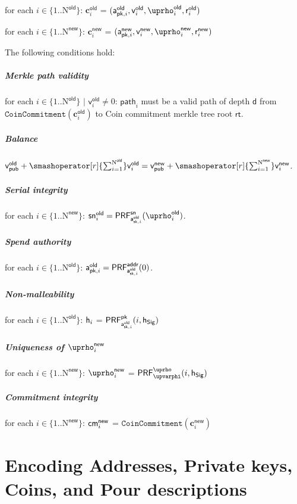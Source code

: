 \documentclass{article}
\newcommand{\SpendAuthorityPublicOld}[1]{\mathsf{a^{old}_{pk,\mathnormal{#1}}}}
\newcommand{\SpendAuthorityPrivateOld}[1]{\mathsf{a^{old}_{sk,\mathnormal{#1}}}}
\newcommand{\SpendAuthorityPublicNew}[1]{\mathsf{a^{new}_{pk,\mathnormal{#1}}}}
\newcommand{\CoinCommitRandOld}[1]{\mathsf{r^{old}_\mathnormal{#1}}}
\newcommand{\CoinCommitRandNew}[1]{\mathsf{r^{new}_\mathnormal{#1}}}
\newcommand{\CoinAddressRand}{\mathsf{\uprho}}
\newcommand{\CoinAddressRandOld}[1]{\mathsf{\uprho^{old}_\mathnormal{#1}}}
\newcommand{\CoinAddressRandNew}[1]{\mathsf{\uprho^{new}_\mathnormal{#1}}}
\newcommand{\CoinAddressPreRand}{\mathsf{\upvarphi}}
\newcommand{\PRF}[2]{\mathsf{{PRF}^{#2}_\mathnormal{#1}}}
\newcommand{\PRFaddr}[1]{\PRF{#1}{addr}}
\newcommand{\PRFsn}[1]{\PRF{#1}{sn}}
\newcommand{\PRFpk}[1]{\PRF{#1}{pk}}
\newcommand{\PRFrho}[1]{\PRF{#1}{\CoinAddressRand}}
\newcommand{\cmNew}[1]{\mathsf{{cm}^{new}_\mathnormal{#1}}}
\newcommand{\MerkleDepth}{\mathsf{d}}
\newcommand{\snOld}[1]{\mathsf{{sn}^{old}_\mathnormal{#1}}}
\newcommand{\vsum}[2]{\smashoperator[r]{\sum_{#1}^{#2}}}
\newcommand{\rt}{\mathsf{rt}}
\newcommand{\hSig}{\mathsf{h_{Sig}}}
\newcommand{\h}[1]{\mathsf{h_{\mathnormal{#1}}}}
\newcommand{\NOld}{\mathrm{N}^\mathsf{old}}
\newcommand{\NNew}{\mathrm{N}^\mathsf{new}}
\newcommand{\vpubOld}{\mathsf{v_{pub}^{old}}}
\newcommand{\vpubNew}{\mathsf{v_{pub}^{new}}}
\newcommand{\cOld}[1]{\mathbf{c}_{#1}^\mathsf{old}}
\newcommand{\cNew}[1]{\mathbf{c}_{#1}^\mathsf{new}}
\newcommand{\vOld}[1]{\mathsf{v}_{#1}^\mathsf{old}}
\newcommand{\vNew}[1]{\mathsf{v}_{#1}^\mathsf{new}}
\newcommand{\treepath}[1]{\mathsf{path}_{#1}}
\newcommand{\CoinCommitment}[1]{\mathtt{CoinCommitment}(#1)}
\begin{document}
\begin{list}{}{}

\item for each $i \in \{1..\NOld\}$: $\cOld{i}$ = $(\SpendAuthorityPublicOld{i},
\vOld{i}, \CoinAddressRandOld{i}, \CoinCommitRandOld{i})$

\item for each $i \in \{1..\NNew\}$: $\cNew{i}$ = $(\SpendAuthorityPublicNew{i},
\vNew{i}, \CoinAddressRandNew{i}, \CoinCommitRandNew{i})$

\item The following conditions hold:

\end{list}

\subparagraph{Merkle path validity}

for each $i \in \{1..\NOld\}$ $\mid$ $\vOld{i} \neq 0$: $\treepath{i}$ must be a valid path
of depth $\MerkleDepth$ from \linebreak $\CoinCommitment{\cOld{i}}$ to Coin 
commitment merkle tree root $\rt$.

\subparagraph{Balance}

$\vpubOld + \vsum{i=1}{\NOld} \vOld{i} = \vpubNew + \vsum{i=1}{\NNew} \vNew{i}$.

\subparagraph{Serial integrity}

for each $i \in \{1..\NNew\}$: 
$\snOld{i} = \PRFsn{\SpendAuthorityPrivateOld{i}}(\CoinAddressRandOld{i})$.

\subparagraph{Spend authority}

for each $i \in \{1..\NOld\}$:
$\SpendAuthorityPublicOld{i} = \PRFaddr{\SpendAuthorityPrivateOld{i}}(0)$.

\subparagraph{Non-malleability}

for each $i \in \{1..\NOld\}$: $\h{i}$ = $\PRFpk{\SpendAuthorityPrivateOld{i}}(i, \hSig)$

\subparagraph{Uniqueness of $\CoinAddressRandNew{i}$}

for each $i \in \{1..\NNew\}$: $\CoinAddressRandNew{i}$ = $\PRFrho{\CoinAddressPreRand}(i, \hSig)$

\subparagraph{Commitment integrity}

for each $i \in \{1..\NNew\}$: $\cmNew{i}$ = $\CoinCommitment{\cNew{i}}$

\section{Encoding Addresses, Private keys, Coins, and Pour descriptions}
\end{document}
